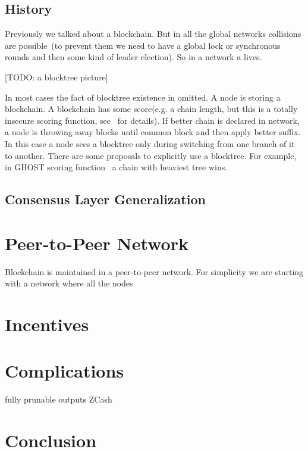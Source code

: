 \documentclass[]{report}   %
\begin{document}
\subsection{History}

Previously we talked about a blockchain. But in all the global networks collisions are possible~(to prevent them we need to have a global lock or synchronous rounds and then some kind of leader election). So in a network a  lives.

[TODO: a blocktree picture]

In most cases the fact of blocktree existence in omitted. A node is storing a blockchain. A blockchain has some score(e.g. a chain length, but this is a totally insecure scoring function, see~\cite{stackexchange} for details). If better chain is declared in network, a node is throwing away blocks until common block and then apply better suffix. In this case a node sees a blocktree only during switching from one branch of it to another. There are some proposals to explicitly use a blocktree. For example, in GHOST scoring function~\cite{sompolinsky2015secure} a chain with heaviest tree wins. 


\subsection{Consensus Layer Generalization}

\section{Peer-to-Peer Network}	

Blockchain is maintained in a peer-to-peer network. For simplicity we are starting with a network where all the nodes 

\section{Incentives}



\section{Complications}

fully prunable outputs 
ZCash

\section{Conclusion}
\end{document}
